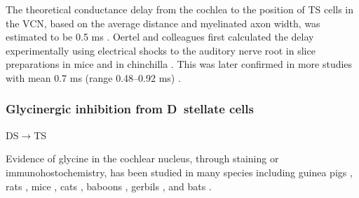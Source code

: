  The theoretical conductance delay from the cochlea to the position of TS cells in
 the VCN, based on the average distance and myelinated axon width, was estimated to
 be 0.5 ms \citep{Brown:1993,BrownLedwith:1990}.  Oertel and colleagues first
 calculated the delay experimentally using electrical shocks to the auditory nerve
 root in slice preparations in mice \citep[0.7 ms][]{Oertel:1983} and in chinchilla
 \citep[0.5 ms][]{WickesbergOertel:1993}. This was later confirmed in more studies
 with mean 0.7 ms (range 0.48--0.92 ms) \citep[mice][]{FerragamoGoldingEtAl:1998a}.



 \subsubsection{Glycinergic inhibition from D~stellate cells}

 DS\ensuremath{\rightarrow}TS




 Evidence of glycine in the cochlear nucleus, through staining or
 immunohostochemistry, has been studied in many species including guinea pigs
 \citep{JuizHelfertEtAl:1996a,HelfertBonneauEtAl:1989,Wenthold:1987,WentholdHuieEtAl:1987,AltschulerBetzEtAl:1986,SaintBensonEtAl:1991,KolstonOsenEtAl:1992,PeyretCampistronEtAl:1987,Alibardi:2003a,MahendrasingamWallamEtAl:2004,MahendrasingamWallamEtAl:2000,BabalianJacommeEtAl:2002},
 rats
 \citep{OsenLopezEtAl:1991,Mugnaini:1985,AokiSembaEtAl:1988,GatesWeedmanEtAl:1996,Alibardi:2003,LimOleskevichEtAl:2003,SrinivasanFriaufEtAl:2004,DoucetRossEtAl:1999},
 mice \citep{WickesbergWhitlonEtAl:1991,LimOleskevichEtAl:2003,YangDoievEtAl:2002},
 cats \citep{OsenOttersenEtAl:1990,SmithRhode:1989}, baboons
 \citep{MooreOsenEtAl:1996}, gerbils \citep{GleichVater:1998}, and bats
 \citep{KemmerVater:2001a}.



